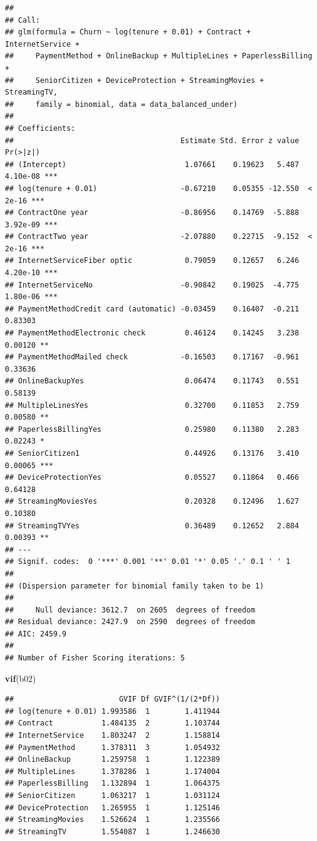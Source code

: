 \documentclass[
  twoside]{article}
\newenvironment{Shaded}{\begin{snugshade}}{\end{snugshade}}
\newcommand{\FunctionTok}[1]{\textcolor[rgb]{0.13,0.29,0.53}{\textbf{#1}}}
\newcommand{\NormalTok}[1]{#1}
\begin{document}
\begin{verbatim}
## 
## Call:
## glm(formula = Churn ~ log(tenure + 0.01) + Contract + InternetService + 
##     PaymentMethod + OnlineBackup + MultipleLines + PaperlessBilling + 
##     SeniorCitizen + DeviceProtection + StreamingMovies + StreamingTV, 
##     family = binomial, data = data_balanced_under)
## 
## Coefficients:
##                                      Estimate Std. Error z value Pr(>|z|)    
## (Intercept)                           1.07661    0.19623   5.487 4.10e-08 ***
## log(tenure + 0.01)                   -0.67210    0.05355 -12.550  < 2e-16 ***
## ContractOne year                     -0.86956    0.14769  -5.888 3.92e-09 ***
## ContractTwo year                     -2.07880    0.22715  -9.152  < 2e-16 ***
## InternetServiceFiber optic            0.79059    0.12657   6.246 4.20e-10 ***
## InternetServiceNo                    -0.90842    0.19025  -4.775 1.80e-06 ***
## PaymentMethodCredit card (automatic) -0.03459    0.16407  -0.211  0.83303    
## PaymentMethodElectronic check         0.46124    0.14245   3.238  0.00120 ** 
## PaymentMethodMailed check            -0.16503    0.17167  -0.961  0.33636    
## OnlineBackupYes                       0.06474    0.11743   0.551  0.58139    
## MultipleLinesYes                      0.32700    0.11853   2.759  0.00580 ** 
## PaperlessBillingYes                   0.25980    0.11380   2.283  0.02243 *  
## SeniorCitizen1                        0.44926    0.13176   3.410  0.00065 ***
## DeviceProtectionYes                   0.05527    0.11864   0.466  0.64128    
## StreamingMoviesYes                    0.20328    0.12496   1.627  0.10380    
## StreamingTVYes                        0.36489    0.12652   2.884  0.00393 ** 
## ---
## Signif. codes:  0 '***' 0.001 '**' 0.01 '*' 0.05 '.' 0.1 ' ' 1
## 
## (Dispersion parameter for binomial family taken to be 1)
## 
##     Null deviance: 3612.7  on 2605  degrees of freedom
## Residual deviance: 2427.9  on 2590  degrees of freedom
## AIC: 2459.9
## 
## Number of Fisher Scoring iterations: 5
\end{verbatim}

\begin{Shaded}
\begin{Highlighting}[]
\FunctionTok{vif}\NormalTok{(b02)}
\end{Highlighting}
\end{Shaded}

\begin{verbatim}
##                        GVIF Df GVIF^(1/(2*Df))
## log(tenure + 0.01) 1.993586  1        1.411944
## Contract           1.484135  2        1.103744
## InternetService    1.803247  2        1.158814
## PaymentMethod      1.378311  3        1.054932
## OnlineBackup       1.259758  1        1.122389
## MultipleLines      1.378286  1        1.174004
## PaperlessBilling   1.132894  1        1.064375
## SeniorCitizen      1.063217  1        1.031124
## DeviceProtection   1.265955  1        1.125146
## StreamingMovies    1.526624  1        1.235566
## StreamingTV        1.554087  1        1.246630
\end{verbatim}
\end{document}

